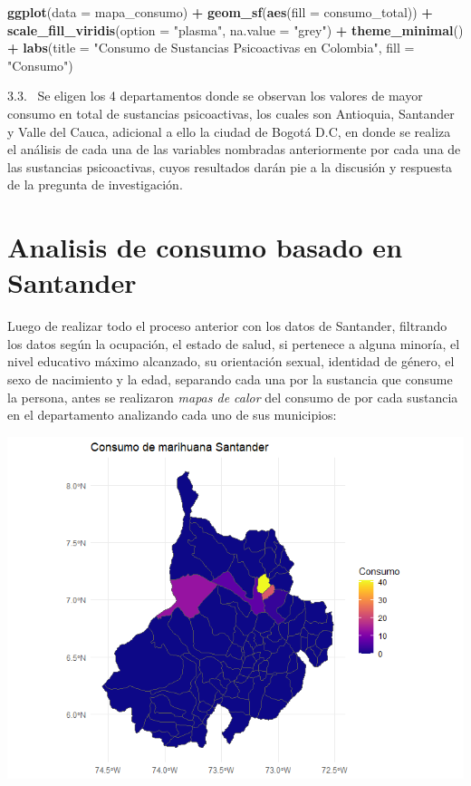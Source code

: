 \documentclass[
]{article}
\newenvironment{Shaded}{\begin{snugshade}}{\end{snugshade}}
\newcommand{\AttributeTok}[1]{\textcolor[rgb]{0.13,0.29,0.53}{#1}}
\newcommand{\FunctionTok}[1]{\textcolor[rgb]{0.13,0.29,0.53}{\textbf{#1}}}
\newcommand{\NormalTok}[1]{#1}
\newcommand{\SpecialCharTok}[1]{\textcolor[rgb]{0.81,0.36,0.00}{\textbf{#1}}}
\newcommand{\StringTok}[1]{\textcolor[rgb]{0.31,0.60,0.02}{#1}}
\begin{document}
\begin{Shaded}
\begin{Highlighting}[]
\FunctionTok{ggplot}\NormalTok{(}\AttributeTok{data =}\NormalTok{ mapa\_consumo) }\SpecialCharTok{+}
  \FunctionTok{geom\_sf}\NormalTok{(}\FunctionTok{aes}\NormalTok{(}\AttributeTok{fill =}\NormalTok{ consumo\_total)) }\SpecialCharTok{+}
  \FunctionTok{scale\_fill\_viridis}\NormalTok{(}\AttributeTok{option =} \StringTok{"plasma"}\NormalTok{, }\AttributeTok{na.value =} \StringTok{"grey"}\NormalTok{) }\SpecialCharTok{+}
  \FunctionTok{theme\_minimal}\NormalTok{() }\SpecialCharTok{+}
  \FunctionTok{labs}\NormalTok{(}\AttributeTok{title =} \StringTok{"Consumo de Sustancias Psicoactivas en Colombia"}\NormalTok{,}
       \AttributeTok{fill =} \StringTok{"Consumo"}\NormalTok{)}
\end{Highlighting}
\end{Shaded}

3.3.~ Se eligen los 4 departamentos donde se observan los valores de
mayor consumo en total de sustancias psicoactivas, los cuales son
Antioquia, Santander y Valle del Cauca, adicional a ello la ciudad de
Bogotá D.C, en donde se realiza el análisis de cada una de las variables
nombradas anteriormente por cada una de las sustancias psicoactivas,
cuyos resultados darán pie a la discusión y respuesta de la pregunta de
investigación.

\section{Analisis de consumo basado en
Santander}\label{analisis-de-consumo-basado-en-santander}

Luego de realizar todo el proceso anterior con los datos de Santander,
filtrando los datos según la ocupación, el estado de salud, si pertenece
a alguna minoría, el nivel educativo máximo alcanzado, su orientación
sexual, identidad de género, el sexo de nacimiento y la edad, separando
cada una por la sustancia que consume la persona, antes se realizaron
\emph{mapas de calor} del consumo de por cada sustancia en el
departamento analizando cada uno de sus municipios:

\includegraphics{images/Mapa de consumo de marihuana en santander.png}
\end{document}
